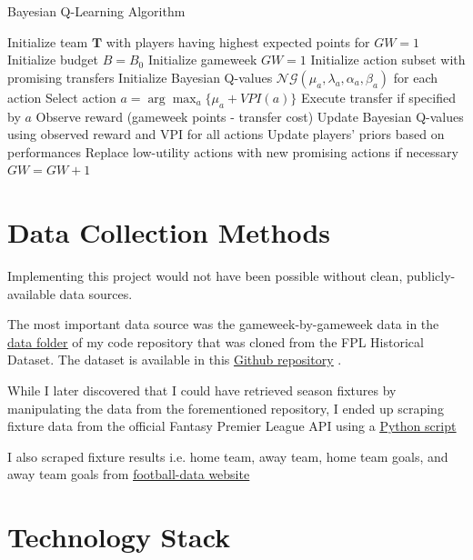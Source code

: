 \begin{algorithm}
\caption{Bayesian Q-Learning Algorithm}
\begin{algorithmic}[1]
\State Initialize team $\mathbf{T}$ with players having highest expected points for $GW = 1$
\State Initialize budget $B = B_0$
\State Initialize gameweek $GW = 1$
\State Initialize action subset with promising transfers
\State Initialize Bayesian Q-values $\mathcal{NG}(\mu_a, \lambda_a, \alpha_a, \beta_a)$ for each action
    \State Select action $a = \arg\max_a \{\mu_a + VPI(a)\}$ 
    \State Execute transfer if specified by $a$
    \State Observe reward (gameweek points - transfer cost)
    \State Update Bayesian Q-values using observed reward and VPI for all actions
    \State Update players' priors based on performances
    \State Replace low-utility actions with new promising actions if necessary
    \State $GW = GW + 1$
\EndWhile
\end{algorithmic}
\label{alg:bayesianQLearning}
\end{algorithm}

\section{Data Collection Methods}
Implementing this project would not have been possible without clean, publicly-available data sources. 

The most important data source was the gameweek-by-gameweek data in the \\ \href{https://github.com/MUN3N3Z/FPL_AI/tree/main/data}{\underline{data folder}} of my code repository that was cloned from the FPL Historical Dataset. The dataset is available in this \href{https://github.com/vaastav/Fantasy-Premier-League/tree/master}{\underline{Github repository}} \cite{anand2016fantasypremierleague}.

While I later discovered that I could have retrieved season fixtures by manipulating the data from the forementioned repository, I ended up scraping fixture data from the official Fantasy Premier League API using a \href{https://github.com/MUN3N3Z/FPL_AI/tree/main/scripts/save_season_fixtures.py}{\underline{Python script}}

I also scraped fixture results i.e. home team, away team, home team goals, and away team goals from \href{www.football-data.co.uk}{\underline{football-data website}}

\section{Technology Stack}
